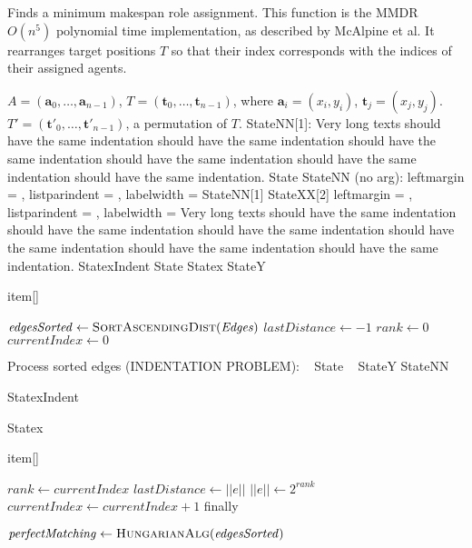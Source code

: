 \documentclass[notitlepage,english]{hgbreport}
\begin{document}
\begin{algorithm}	 %
\caption{Finds a minimum makespan role assignment. This function is the MMDR $O(n^5)$ polynomial time implementation, as described by McAlpine et al. It rearranges target positions $T$ so that their index corresponds with the indices of their assigned agents.}
\label{alg:mmdr}
\begin{algorithmic}[1]%
%
\Input $A = (\mathbf{a}_0, \dots, \mathbf{a}_{n-1})$, 
	$T = (\mathbf{t}_0, \dots, \mathbf{t}_{n-1})$,
	where $\mathbf{a}_i = (x_i, y_i)$, $\mathbf{t}_j = (x_j, y_j)$. 
\Returns $T' = (\mathbf{t}'_0, \dots, \mathbf{t}'_{n-1})$, a permutation of $T$.
%
\StateNN[1] StateNN[1]: Very long texts should have the same indentation should have the same indentation 
should have the same indentation should have the same indentation should have the same indentation 
should have the same indentation.
\State State
\StateNN StateNN (no arg): leftmargin = \the\leftmargin, listparindent = \the\listparindent,
														labelwidth = \the{}
\StateNN[1] StateNN[1]
\StateXX[1] StateXX[2] leftmargin = \the\leftmargin, listparindent = \the\listparindent,
						labelwidth = \the{} Very long texts should have the same indentation 
						should have the same indentation 
	should have the same indentation should have the same indentation should have the same indentation 
	should have the same indentation.
\StatexIndent[1] StatexIndent
\State State
\Statex Statex
\StateY StateY
\item[] item[]


\State $\mathit{edgesSorted} \gets \Call{SortAscendingDist}{\mathit{Edges}}$
\State $\mathit{lastDistance} \gets -1$
\State $\mathit{rank} \gets 0$
\State$\mathit{currentIndex} \gets 0$


\Statex Process sorted edges (INDENTATION PROBLEM): \SHOWnested
{}
	 \SHOWthistlm\ \SHOWnested
		\State State \SHOWthistlm\ \SHOWnested
		\StateY StateY
		\StateNN StateNN
		
		\StatexIndent[3] StatexIndent
		
		\Statex Statex \SHOWnested
		\item[] item[] \SHOWnested
		
		\State$\mathit{rank} \gets \mathit{currentIndex}$ \SHOWnested
	\EndIf
	\State$\mathit{lastDistance} \gets ||e||$ \SHOWnested
	\State$||e|| \gets 2^{\mathit{rank}}$
	\State$\mathit{currentIndex} \gets \mathit{currentIndex} + 1$
	\State finally \SHOWnested
\EndFor

\State $\mathit{perfectMatching} \gets \Call{HungarianAlg}{\mathit{edgesSorted}}$ 
\EndProcedure
\end{algorithmic}
 \end{algorithm}
\end{document}
